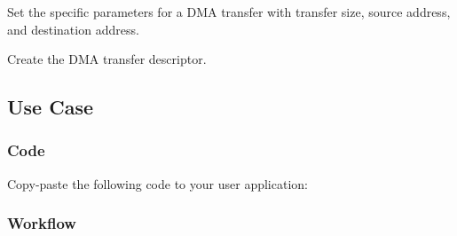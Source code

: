 \begin{DoxyEnumerate}
\item Set the specific parameters for a D\+MA transfer with transfer size, source address, and destination address. 
\begin{DoxyCodeInclude}{0}
\end{DoxyCodeInclude}
 
\begin{DoxyCodeInclude}{0}
\end{DoxyCodeInclude}

\item Create the D\+MA transfer descriptor. 
\begin{DoxyCodeInclude}{0}
\end{DoxyCodeInclude}
 
\begin{DoxyCodeInclude}{0}
\end{DoxyCodeInclude}
 
\end{DoxyEnumerate}\hypertarget{asfdoc_sam0_sercom_spi_dma_use_case_asfdoc_sam0_spi_dma_use_case_main}{}\subsection{Use Case}\label{asfdoc_sam0_sercom_spi_dma_use_case_asfdoc_sam0_spi_dma_use_case_main}
\hypertarget{asfdoc_sam0_sercom_spi_dma_use_case_asfdoc_sam0_spi_dma_use_case_main_code}{}\subsubsection{Code}\label{asfdoc_sam0_sercom_spi_dma_use_case_asfdoc_sam0_spi_dma_use_case_main_code}
Copy-\/paste the following code to your user application\+: 
\begin{DoxyCodeInclude}{0}
\end{DoxyCodeInclude}
 \hypertarget{asfdoc_sam0_sercom_spi_dma_use_case_asfdoc_sam0_spi_dma_use_case_main_flow}{}\subsubsection{Workflow}\label{asfdoc_sam0_sercom_spi_dma_use_case_asfdoc_sam0_spi_dma_use_case_main_flow}

